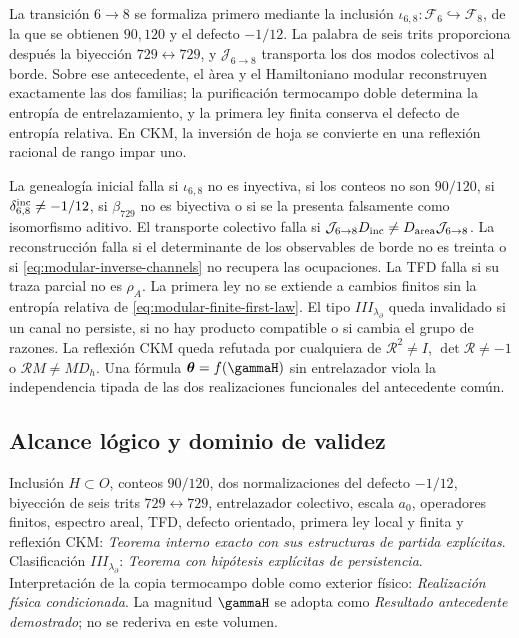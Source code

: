 \begin{proposition}
La transici\'on \(6\to8\) se formaliza primero mediante la inclusi\'on
\(\iota_{6,8}:\mathcal F_6\hookrightarrow\mathcal F_8\), de la que se
obtienen
\(90,120\) y el defecto \(-1/12\). La palabra de seis trits proporciona
despu\'es la biyecci\'on \(729\leftrightarrow729\), y
\(\mathcal J_{6\to8}\) transporta los dos modos colectivos al borde. Sobre
ese antecedente, el \`area y el Hamiltoniano modular reconstruyen exactamente
las dos familias; la purificaci\'on termocampo doble determina la entrop\'ia
de entrelazamiento, y la primera ley
finita conserva el defecto de entrop\'ia relativa. En CKM, la inversi\'on de
hoja se convierte en una reflexi\'on racional de rango impar uno.
\end{proposition}

\begin{remark}
La genealog\'ia inicial falla si \(\iota_{6,8}\) no es inyectiva, si los
conteos no son \(90/120\), si \(\delta_{6,8}^{\rm inc}\neq-1/12\), si
\(\beta_{729}\) no es biyectiva o si se la presenta falsamente como
isomorfismo aditivo. El transporte colectivo falla si
\(\mathcal J_{6\to8}D_{\rm inc}\neq
D_{\rm area}\mathcal J_{6\to8}\). La reconstrucci\'on falla si el
determinante de los observables de borde no es treinta o si
\cref{eq:modular-inverse-channels} no recupera las ocupaciones.
La TFD falla si su traza parcial no es \(\rho_A\). La primera ley no se
extiende a cambios finitos sin la entrop\'ia relativa de
\cref{eq:modular-finite-first-law}. El tipo
\(III_{\lambda_\partial}\) queda invalidado si un canal no persiste, si no hay
producto compatible o si cambia el grupo de razones. La reflexi\'on CKM
queda refutada por cualquiera de
\(\mathcal R^2\neq I\), \(\det\mathcal R\neq-1\) o
\(\mathcal RM\neq MD_h\). Una f\'ormula
\(\boldsymbol\theta=f(\gammaH)\) sin entrelazador viola la independencia
tipada de las dos realizaciones funcionales del antecedente com\'un.
\end{remark}

\subsection*{Alcance lógico y dominio de validez}
Inclusi\'on \(H\subset O\), conteos \(90/120\), dos normalizaciones del
defecto \(-1/12\), biyecci\'on de seis trits \(729\leftrightarrow729\),
entrelazador colectivo, escala \(a_0\), operadores finitos, espectro areal,
TFD, defecto orientado, primera ley local y finita y reflexi\'on CKM:
\emph{Teorema interno exacto con sus estructuras de partida expl\'icitas}.
Clasificaci\'on
\(III_{\lambda_\partial}\): \emph{Teorema con hip\'otesis expl\'icitas de
persistencia}. Interpretaci\'on de la copia termocampo doble como exterior f\'isico:
\emph{Realizaci\'on f\'isica condicionada}. La magnitud \(\gammaH\) se adopta
como \emph{Resultado antecedente demostrado}; no se rederiva en este volumen.

